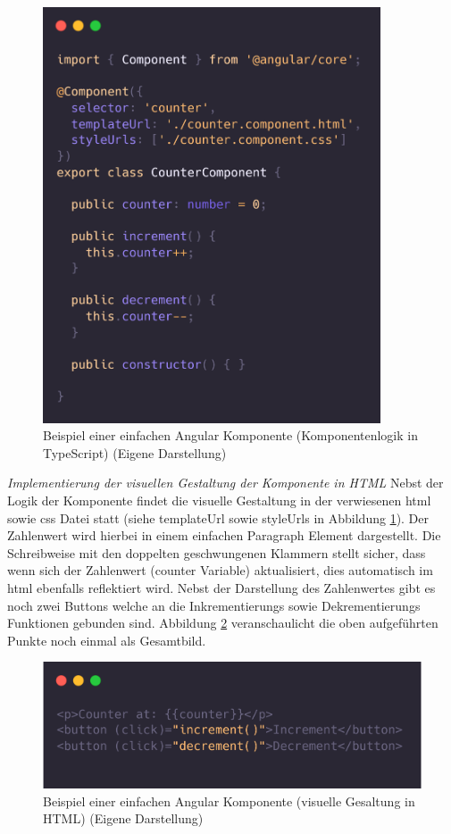 \begin{figure}[h]
    \includegraphics[width=10cm]{images/angular_component_ts.png}
    \centering
    \caption{Beispiel einer einfachen Angular Komponente (Komponentenlogik in TypeScript) (Eigene Darstellung)}
    \label{fig:angular_component_ts}
\end{figure}

\clearpage
\textit{Implementierung der visuellen Gestaltung der Komponente in HTML}
\newline
Nebst der Logik der Komponente findet die visuelle Gestaltung in der verwiesenen \gls{html} sowie \gls{css} Datei statt (siehe templateUrl sowie styleUrls in Abbildung \ref{fig:angular_component_ts}). Der Zahlenwert wird hierbei in einem einfachen Paragraph Element dargestellt. Die Schreibweise mit den doppelten geschwungenen Klammern stellt sicher, dass wenn sich der Zahlenwert (counter Variable) aktualisiert, dies automatisch im \gls{html} ebenfalls reflektiert wird. Nebst der Darstellung des Zahlenwertes gibt es noch zwei Buttons welche an die Inkrementierungs sowie Dekrementierungs Funktionen gebunden sind. Abbildung \ref{fig:angular_component_html} veranschaulicht die oben aufgeführten Punkte noch einmal als Gesamtbild.

\begin{figure}[h]
    \includegraphics[width=12cm]{images/angular_component_html.png}
    \centering
    \caption{Beispiel einer einfachen Angular Komponente (visuelle Gesaltung in HTML) (Eigene Darstellung)}
    \label{fig:angular_component_html}
\end{figure}

